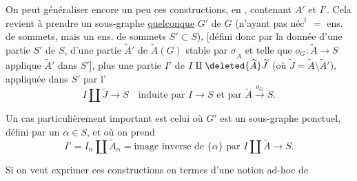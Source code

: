 On peut généraliser encore un peu ces constructions, en    , contenant $A'$ et $I'$. Cela revient à prendre un sous-graphe \uline{quelconque} $G'$ de $G$ (n'ayant pas $\text{néc}^{\text{t}}$  $=$ ens. de sommets, mais un ens. de sommets $S'\subset S$), [défini donc par la donnée d'une partie $S'$ de $S$, d'une partie $\widetilde A'$ de $\widetilde A(G)$ stable par $\sigma_{\widetilde A}$ et telle que $o_G:\widetilde A\longrightarrow S$ applique $\widetilde A'$ dans $S'$], plus une partie $I'$ de $I\amalg\deleted{\widetilde A}\widetilde J$ (où $\widetilde J=\widetilde A\setminus\widetilde A'$), appliquée dans $S'$ par l'
\[
I\amalg\widetilde J\longrightarrow S\quad\text{induite par }I\longrightarrow S\text{ et par }\widetilde A\xrightarrow{o_G}S.
\]

Un cas particulièrement important est celui où $G'$ est un sous-graphe ponctuel, défini par un $\alpha\in S$,  et où on prend
\[
I'=I_\alpha\amalg\widetilde A_\alpha=\text{image inverse de }\{\alpha\}\text{ par }I\amalg\widetilde A\longrightarrow S.
\]

Si on veut exprimer ces constructions en termes d'une notion ad-hoc de
